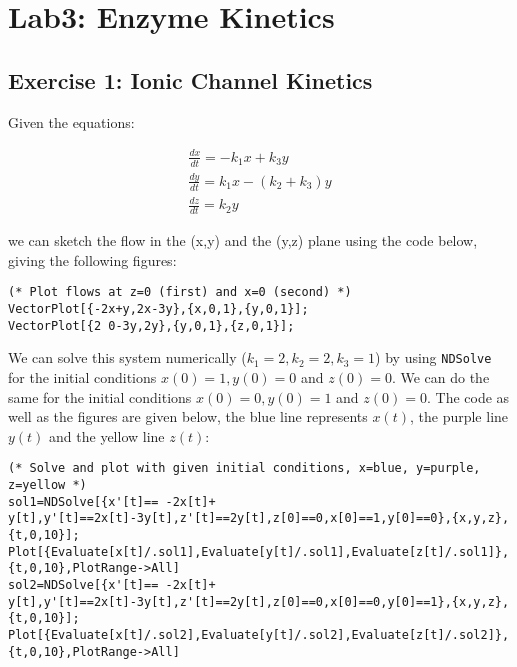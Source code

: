 \documentclass[11pt,a4paper,onecolumn]{article}
\begin{document}
\newpage

\section{Lab3: Enzyme Kinetics }
\subsection{Exercise 1: Ionic Channel Kinetics}

Given the equations:

\begin{align*}
  \frac{dx}{dt} = -k_1 x + k_3 y \nonumber \\
  \frac{dy}{dt} = k_1 x - (k_2 + k_3) y \nonumber \\
  \frac{dz}{dt} = k_2 y
\end{align*}

we can sketch the flow in the (x,y) and the (y,z) plane using the code below, giving the following figures:

\begin{lstlisting}[mathescape]
(* Plot flows at z=0 (first) and x=0 (second) *)
VectorPlot[{-2x+y,2x-3y},{x,0,1},{y,0,1}];
VectorPlot[{2 0-3y,2y},{y,0,1},{z,0,1}];
\end{lstlisting}

\begin{figure}[H]
  \centering
\end{figure}

We can solve this system numerically ($k_1 = 2, k_2 = 2, k_3 = 1$) by using \texttt{NDSolve} for the initial conditions $x(0) = 1, y(0) = 0$ and $z(0) = 0$. We can do the same for the initial conditions $x(0) = 0, y(0) = 1$ and $z(0) = 0$. The code as well as the figures are given below, the blue line represents $x(t)$, the purple line $y(t)$ and the yellow line $z(t)$:

\begin{lstlisting}[mathescape]
(* Solve and plot with given initial conditions, x=blue, y=purple, z=yellow *)
sol1=NDSolve[{x'[t]== -2x[t]+ y[t],y'[t]==2x[t]-3y[t],z'[t]==2y[t],z[0]==0,x[0]==1,y[0]==0},{x,y,z},{t,0,10}];
Plot[{Evaluate[x[t]/.sol1],Evaluate[y[t]/.sol1],Evaluate[z[t]/.sol1]},{t,0,10},PlotRange->All]
sol2=NDSolve[{x'[t]== -2x[t]+ y[t],y'[t]==2x[t]-3y[t],z'[t]==2y[t],z[0]==0,x[0]==0,y[0]==1},{x,y,z},{t,0,10}];
Plot[{Evaluate[x[t]/.sol2],Evaluate[y[t]/.sol2],Evaluate[z[t]/.sol2]},{t,0,10},PlotRange->All]
\end{lstlisting}
\end{document}
